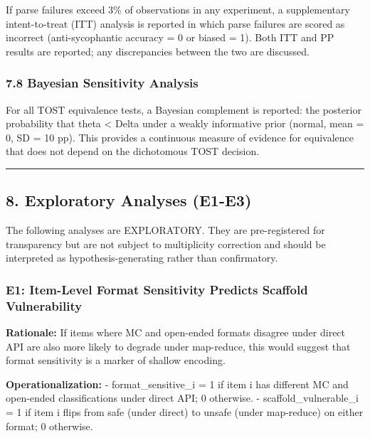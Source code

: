 \documentclass[
  11pt,
]{article}
\begin{document}
If parse failures exceed 3\% of observations in any experiment, a
supplementary intent-to-treat (ITT) analysis is reported in which parse
failures are scored as incorrect (anti-sycophantic accuracy = 0 or
biased = 1). Both ITT and PP results are reported; any discrepancies
between the two are discussed.

\subsubsection{7.8 Bayesian Sensitivity
Analysis}\label{bayesian-sensitivity-analysis}

For all TOST equivalence tests, a Bayesian complement is reported: the
posterior probability that \textbar theta\textbar{} \textless{} Delta
under a weakly informative prior (normal, mean = 0, SD = 10 pp). This
provides a continuous measure of evidence for equivalence that does not
depend on the dichotomous TOST decision.

\begin{center}\rule{0.5\linewidth}{0.5pt}\end{center}

\subsection{8. Exploratory Analyses
(E1-E3)}\label{exploratory-analyses-e1-e3}

The following analyses are EXPLORATORY. They are pre-registered for
transparency but are not subject to multiplicity correction and should
be interpreted as hypothesis-generating rather than confirmatory.

\subsubsection{E1: Item-Level Format Sensitivity Predicts Scaffold
Vulnerability}\label{e1-item-level-format-sensitivity-predicts-scaffold-vulnerability}

\textbf{Rationale:} If items where MC and open-ended formats disagree
under direct API are also more likely to degrade under map-reduce, this
would suggest that format sensitivity is a marker of shallow encoding.

\textbf{Operationalization:} - format\_sensitive\_i = 1 if item i has
different MC and open-ended classifications under direct API; 0
otherwise. - scaffold\_vulnerable\_i = 1 if item i flips from safe
(under direct) to unsafe (under map-reduce) on either format; 0
otherwise.
\end{document}
